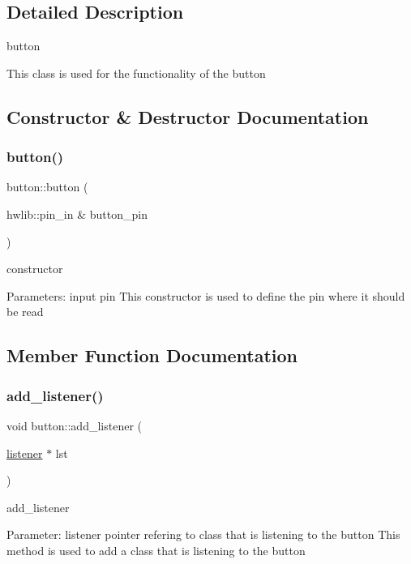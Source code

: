 \subsection{Detailed Description}
button 

This class is used for the functionality of the button 

\subsection{Constructor \& Destructor Documentation}
\hypertarget{classbutton_aae05cb652f48e39acfe810e97ba4b2ea}{}\label{classbutton_aae05cb652f48e39acfe810e97ba4b2ea} 
\subsubsection{\texorpdfstring{button()}{button()}}
{\footnotesize\ttfamily button\+::button (\begin{DoxyParamCaption}\item[{hwlib\+::pin\+\_\+in \&}]{button\+\_\+pin }\end{DoxyParamCaption})}



constructor 

Parameters\+: input pin This constructor is used to define the pin where it should be read 

\subsection{Member Function Documentation}
\hypertarget{classbutton_acd710d9021a2132c250c25938b992b11}{}\label{classbutton_acd710d9021a2132c250c25938b992b11} 
\subsubsection{\texorpdfstring{add\+\_\+listener()}{add\_listener()}}
{\footnotesize\ttfamily void button\+::add\+\_\+listener (\begin{DoxyParamCaption}\item[{\hyperlink{classlistener}{listener} $\ast$}]{lst }\end{DoxyParamCaption})}



add\+\_\+listener 

Parameter\+: listener pointer refering to class that is listening to the button This method is used to add a class that is listening to the button \hypertarget{classbutton_a545f0e24d8317692621c2f503ceb2fea}{}\label{classbutton_a545f0e24d8317692621c2f503ceb2fea} 
